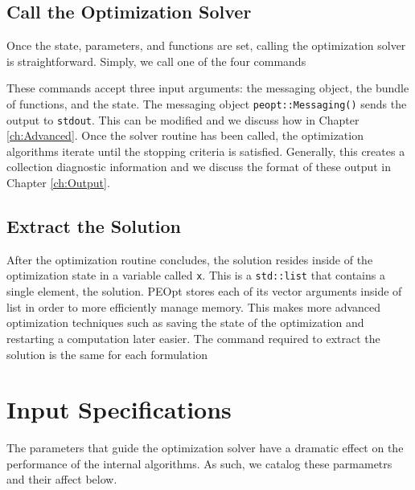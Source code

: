 \documentclass{report}
\begin{document}
\section{Call the Optimization Solver}

       Once the state, parameters, and functions are set, calling the optimization solver is straightforward.  Simply, we call one of the four commands

These commands accept three input arguments: the messaging object, the bundle of functions, and the state.  The messaging object \texttt{peopt::Messaging()} sends the output to \texttt{stdout}.  This can be modified and we discuss how in Chapter \ref{ch:Advanced}.  Once the solver routine has been called, the optimization algorithms iterate until the stopping criteria is satisfied.  Generally, this creates a collection diagnostic information and we discuss the format of these output in Chapter \ref{ch:Output}.

\section{Extract the Solution}

        After the optimization routine concludes, the solution resides inside of the optimization state in a variable called \texttt{x}.  This is a \texttt{std::list} that contains a single element, the solution.  PEOpt stores each of its vector arguments inside of list in order to more efficiently manage memory.  This makes more advanced optimization techniques such as saving the state of the optimization and restarting a computation later easier.  The command required to extract the solution is the same for each formulation


\chapter{Input Specifications}\label{ch:Input}

        The parameters that guide the optimization solver have a dramatic effect on the performance of the internal algorithms.  As such, we catalog these parmametrs and their affect below. 
\end{document}
